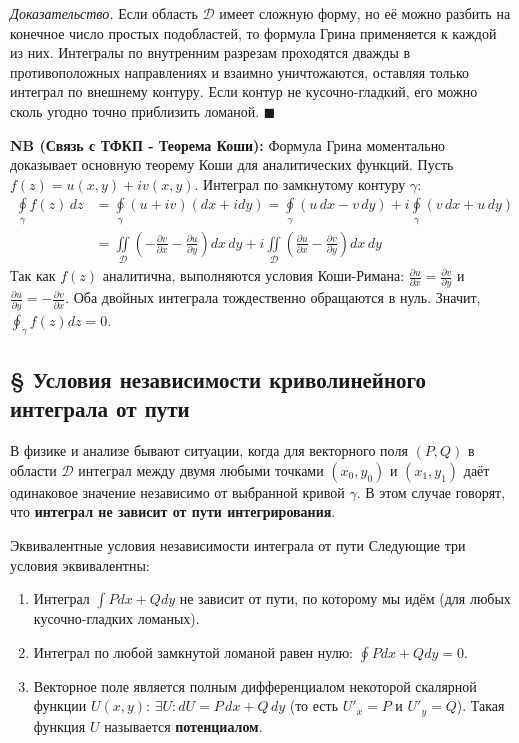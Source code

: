 \documentclass[12pt,a4paper]{article}
\newenvironment{Proof}[1][Доказательство]{\vspace{0.5em}\noindent\textit{#1.}\hspace{0.5em}\ignorespaces}{\hfill$\blacksquare$\vspace{1em}}
\begin{document}
\begin{Proof}
Если область $\mathscr{D}$ имеет сложную форму, но её можно разбить на конечное число простых подобластей, то формула Грина применяется к каждой из них. Интегралы по внутренним разрезам проходятся дважды в противоположных направлениях и взаимно уничтожаются, оставляя только интеграл по внешнему контуру. 
Если контур не кусочно-гладкий, его можно сколь угодно точно приблизить ломаной.
\end{Proof}

\noindent \textbf{NB (Связь с ТФКП - Теорема Коши):} Формула Грина моментально доказывает основную теорему Коши для аналитических функций. Пусть $f(z) = u(x,y) + i v(x,y)$. Интеграл по замкнутому контуру $\gamma$:
\begin{align*}
    \oint\limits_\gamma f(z) \, dz &= \oint\limits_\gamma (u + iv)(dx + idy) = \oint\limits_\gamma (u \, dx - v \, dy) + i \oint\limits_\gamma (v \, dx + u \, dy) \\
    &= \iint\limits_{\mathscr{D}} \left( -\frac{\partial v}{\partial x} - \frac{\partial u}{\partial y} \right) dx \, dy + i \iint\limits_{\mathscr{D}} \left( \frac{\partial u}{\partial x} - \frac{\partial v}{\partial y} \right) dx \, dy
\end{align*}
Так как $f(z)$ аналитична, выполняются условия Коши-Римана: $\frac{\partial u}{\partial x} = \frac{\partial v}{\partial y}$ и $\frac{\partial u}{\partial y} = -\frac{\partial v}{\partial x}$. Оба двойных интеграла тождественно обращаются в нуль. Значит, $\oint_\gamma f(z) dz = 0$.


\subsection{§ Условия независимости криволинейного интеграла от пути}

В физике и анализе бывают ситуации, когда для векторного поля $(P, Q)$ в области $\mathscr{D}$ интеграл между двумя любыми точками $(x_0, y_0)$ и $(x_1, y_1)$ даёт одинаковое значение независимо от выбранной кривой $\gamma$. В этом случае говорят, что \textbf{интеграл не зависит от пути интегрирования}.

\begin{Theorem}{Эквивалентные условия независимости интеграла от пути}{}
Следующие три условия эквивалентны:
\begin{enumerate}
    \item Интеграл $\int Pdx + Qdy$ не зависит от пути, по которому мы идём (для любых кусочно-гладких ломаных).
    \item Интеграл по любой замкнутой ломаной равен нулю: $\oint Pdx + Qdy = 0$.
    \item Векторное поле является полным дифференциалом некоторой скалярной функции $U(x,y)$: $\exists U : dU = P \, dx + Q \, dy$ (то есть $U'_x = P$ и $U'_y = Q$). Такая функция $U$ называется \textbf{потенциалом}.
\end{enumerate}
\end{Theorem}
\end{document}
